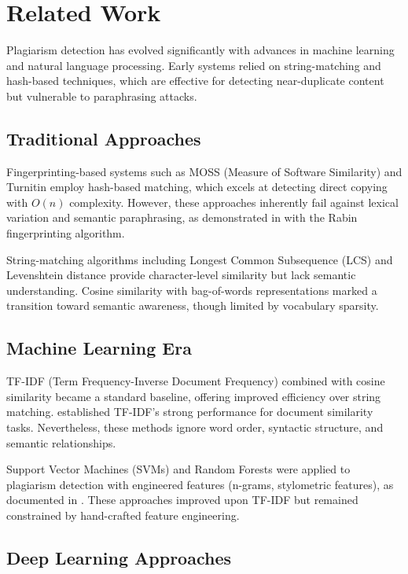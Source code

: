 \section{Related Work} \label{sec:related_work}

Plagiarism detection has evolved significantly with advances in machine learning and natural language processing. Early systems relied on string-matching and hash-based techniques, which are effective for detecting near-duplicate content but vulnerable to paraphrasing attacks.

\subsection{Traditional Approaches}

Fingerprinting-based systems such as MOSS (Measure of Software Similarity) and Turnitin employ hash-based matching, which excels at detecting direct copying with $O(n)$ complexity. However, these approaches inherently fail against lexical variation and semantic paraphrasing, as demonstrated in \cite{Schleimer2003} with the Rabin fingerprinting algorithm.

String-matching algorithms including Longest Common Subsequence (LCS) and Levenshtein distance provide character-level similarity but lack semantic understanding. Cosine similarity with bag-of-words representations marked a transition toward semantic awareness, though limited by vocabulary sparsity.

\subsection{Machine Learning Era}

TF-IDF (Term Frequency-Inverse Document Frequency) combined with cosine similarity became a standard baseline, offering improved efficiency over string matching. \cite{Robertson2009} established TF-IDF's strong performance for document similarity tasks. Nevertheless, these methods ignore word order, syntactic structure, and semantic relationships.

Support Vector Machines (SVMs) and Random Forests were applied to plagiarism detection with engineered features (n-grams, stylometric features), as documented in \cite{Stamatatos2009}. These approaches improved upon TF-IDF but remained constrained by hand-crafted feature engineering.

\subsection{Deep Learning Approaches}

